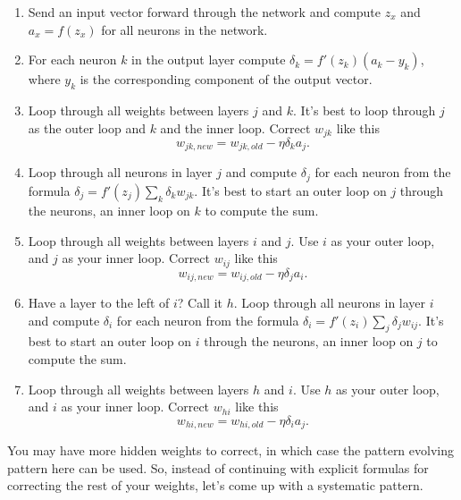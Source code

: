 \documentclass[12pt]{article}
\begin{document}
\begin{enumerate}


\item Send an input vector forward through the network and compute $z_x$ and $a_x=f(z_x)$ for all neurons in the network.

\item For each neuron $k$ in the output layer compute $\delta_k=f'(z_k)(a_k-y_k)$, where $y_k$ is the corresponding component of the output vector.

\item Loop through all weights between layers $j$ and $k$. It's best to loop through $j$ as the outer loop and $k$ and the inner loop.  Correct $w_{jk}$ like this
\begin{equation}
w_{jk,new} = w_{jk,old}-\eta\delta_k a_j.
\end{equation}

\item Loop through all neurons in layer $j$ and compute $\delta_j$ for each neuron from the formula $\delta_j=f'(z_j)\sum_k \delta_k w_{jk}$. It's best to start an outer loop on $j$ through the neurons, an inner loop on $k$ to compute the sum.

\item Loop through all weights between layers $i$ and $j$.  Use $i$ as your outer loop, and $j$ as your inner loop.  Correct $w_{ij}$ like this
\begin{equation}
w_{ij,new} = w_{ij,old}-\eta\delta_j a_i.
\end{equation}

\item \label{bp_loop} Have a layer to the left of $i$? Call it $h$.  Loop through all neurons in layer $i$ and compute $\delta_i$ for each neuron from the formula $\delta_i=f'(z_i)\sum_j \delta_j w_{ij}$.  It's best to start an outer loop on $i$ through the neurons, an inner loop on $j$ to compute the sum.

\item Loop through all weights between layers $h$ and $i$.  Use $h$ as your outer loop, and $i$ as your inner loop.  Correct $w_{hi}$ like this
\begin{equation}
w_{hi,new} = w_{hi,old}-\eta\delta_i a_j.
\end{equation}


\end{enumerate}

You may have more hidden weights to correct, in which case the pattern evolving pattern here can be used. So, instead of continuing with explicit formulas for correcting the rest of your weights, let's come up with a systematic pattern.
\end{document}
